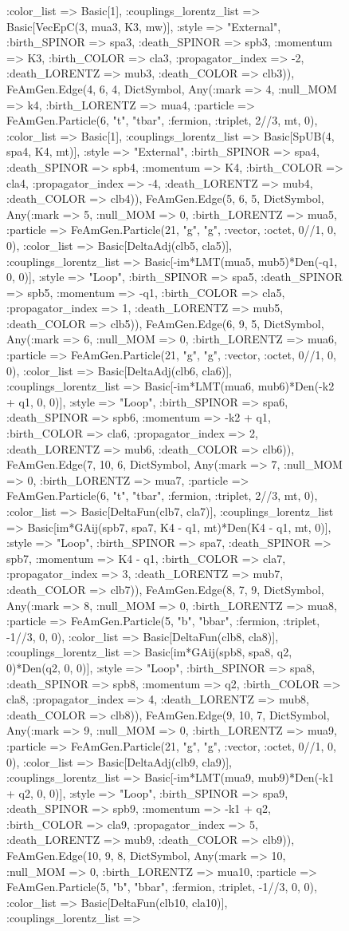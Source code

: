 \documentclass{revtex4}
\begin{document}
\begin{figure}[!htb]
\begin{center}
{:color_list => Basic[1], :couplings_lorentz_list => Basic[VecEpC(3, mua3, K3, mw)], :style => "External", :birth_SPINOR => spa3, :death_SPINOR => spb3, :momentum => K3, :birth_COLOR => cla3, :propagator_index => -2, :death_LORENTZ => mub3, :death_COLOR => clb3)), FeAmGen.Edge(4, 6, 4, Dict{Symbol, Any}(:mark => 4, :null_MOM => k4, :birth_LORENTZ => mua4, :particle => FeAmGen.Particle(6, "t", "tbar", :fermion, :triplet, 2//3, mt, 0), :color_list => Basic[1], :couplings_lorentz_list => Basic[SpUB(4, spa4, K4, mt)], :style => "External", :birth_SPINOR => spa4, :death_SPINOR => spb4, :momentum => K4, :birth_COLOR => cla4, :propagator_index => -4, :death_LORENTZ => mub4, :death_COLOR => clb4)), FeAmGen.Edge(5, 6, 5, Dict{Symbol, Any}(:mark => 5, :null_MOM => 0, :birth_LORENTZ => mua5, :particle => FeAmGen.Particle(21, "g", "g", :vector, :octet, 0//1, 0, 0), :color_list => Basic[DeltaAdj(clb5, cla5)], :couplings_lorentz_list => Basic[-im*LMT(mua5, mub5)*Den(-q1, 0, 0)], :style => "Loop", :birth_SPINOR => spa5, :death_SPINOR => spb5, :momentum => -q1, :birth_COLOR => cla5, :propagator_index => 1, :death_LORENTZ => mub5, :death_COLOR => clb5)), FeAmGen.Edge(6, 9, 5, Dict{Symbol, Any}(:mark => 6, :null_MOM => 0, :birth_LORENTZ => mua6, :particle => FeAmGen.Particle(21, "g", "g", :vector, :octet, 0//1, 0, 0), :color_list => Basic[DeltaAdj(clb6, cla6)], :couplings_lorentz_list => Basic[-im*LMT(mua6, mub6)*Den(-k2 + q1, 0, 0)], :style => "Loop", :birth_SPINOR => spa6, :death_SPINOR => spb6, :momentum => -k2 + q1, :birth_COLOR => cla6, :propagator_index => 2, :death_LORENTZ => mub6, :death_COLOR => clb6)), FeAmGen.Edge(7, 10, 6, Dict{Symbol, Any}(:mark => 7, :null_MOM => 0, :birth_LORENTZ => mua7, :particle => FeAmGen.Particle(6, "t", "tbar", :fermion, :triplet, 2//3, mt, 0), :color_list => Basic[DeltaFun(clb7, cla7)], :couplings_lorentz_list => Basic[im*GAij(spb7, spa7, K4 - q1, mt)*Den(K4 - q1, mt, 0)], :style => "Loop", :birth_SPINOR => spa7, :death_SPINOR => spb7, :momentum => K4 - q1, :birth_COLOR => cla7, :propagator_index => 3, :death_LORENTZ => mub7, :death_COLOR => clb7)), FeAmGen.Edge(8, 7, 9, Dict{Symbol, Any}(:mark => 8, :null_MOM => 0, :birth_LORENTZ => mua8, :particle => FeAmGen.Particle(5, "b", "bbar", :fermion, :triplet, -1//3, 0, 0), :color_list => Basic[DeltaFun(clb8, cla8)], :couplings_lorentz_list => Basic[im*GAij(spb8, spa8, q2, 0)*Den(q2, 0, 0)], :style => "Loop", :birth_SPINOR => spa8, :death_SPINOR => spb8, :momentum => q2, :birth_COLOR => cla8, :propagator_index => 4, :death_LORENTZ => mub8, :death_COLOR => clb8)), FeAmGen.Edge(9, 10, 7, Dict{Symbol, Any}(:mark => 9, :null_MOM => 0, :birth_LORENTZ => mua9, :particle => FeAmGen.Particle(21, "g", "g", :vector, :octet, 0//1, 0, 0), :color_list => Basic[DeltaAdj(clb9, cla9)], :couplings_lorentz_list => Basic[-im*LMT(mua9, mub9)*Den(-k1 + q2, 0, 0)], :style => "Loop", :birth_SPINOR => spa9, :death_SPINOR => spb9, :momentum => -k1 + q2, :birth_COLOR => cla9, :propagator_index => 5, :death_LORENTZ => mub9, :death_COLOR => clb9)), FeAmGen.Edge(10, 9, 8, Dict{Symbol, Any}(:mark => 10, :null_MOM => 0, :birth_LORENTZ => mua10, :particle => FeAmGen.Particle(5, "b", "bbar", :fermion, :triplet, -1//3, 0, 0), :color_list => Basic[DeltaFun(clb10, cla10)], :couplings_lorentz_list => }
\end{center}
\end{figure}
\end{document}
